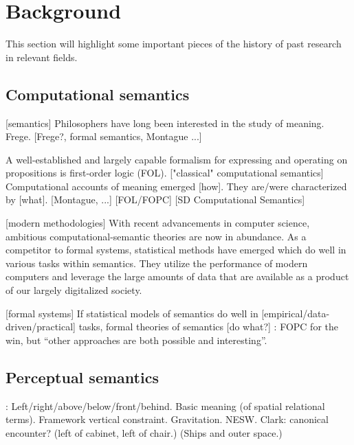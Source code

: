 \glsresetall
\section{Background}
\label{sec:background}

This section will highlight some important pieces of the history of past research in relevant fields.

\subsection{Computational semantics}

[semantics]
Philosophers have long been interested in the study of meaning.
Frege.
[Frege?, formal semantics, Montague ...]

A well-established and largely capable formalism for expressing and operating on propositions is first-order logic (FOL).
["classical" computational semantics]
Computational accounts of meaning emerged [how].
They are/were characterized by [what].
[Montague, ...]
[FOL/FOPC]
\citep{BlackburnComputationalsemantics2003}
[SD Computational Semantics]

[modern methodologies]
With recent advancements in computer science, ambitious computational-semantic theories are now in abundance.
As a competitor to formal systems, statistical methods have emerged which do well in various tasks within semantics.
They utilize the performance of modern computers and leverage the large amounts of data that are available as a product of our largely digitalized society.


[formal systems]
If statistical models of semantics do well in [empirical/data-driven/practical] tasks, formal theories of semantics [do what?]
\cite{BlackburnComputationalsemantics2003}:
FOPC for the win, but ``other approaches are both possible and interesting''.

\cite{Dobnik:2017ag}





\subsection{Perceptual semantics}

\cite{Garnhamunifiedtheorymeaning1989}:
Left/right/above/below/front/behind.
Basic meaning (of spatial relational terms).
Framework vertical constraint.
Gravitation. NESW.
Clark: canonical encounter? (left of cabinet, left of chair.)
(Ships and outer space.)


